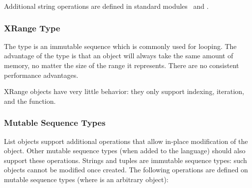 Additional string operations are defined in standard modules
\ and
.


\subsubsection{XRange Type \label{typesseq-xrange}}

The  type is an immutable sequence which
is commonly used for looping.  The advantage of the 
type is that an  object will always take the same amount
of memory, no matter the size of the range it represents.  There are
no consistent performance advantages.

XRange objects have very little behavior: they only support indexing,
iteration, and the  function.


\subsubsection{Mutable Sequence Types \label{typesseq-mutable}}

List objects support additional operations that allow in-place
modification of the object.
Other mutable sequence types (when added to the language) should
also support these operations.
Strings and tuples are immutable sequence types: such objects cannot
be modified once created.
The following operations are defined on mutable sequence types (where
 is an arbitrary object):

